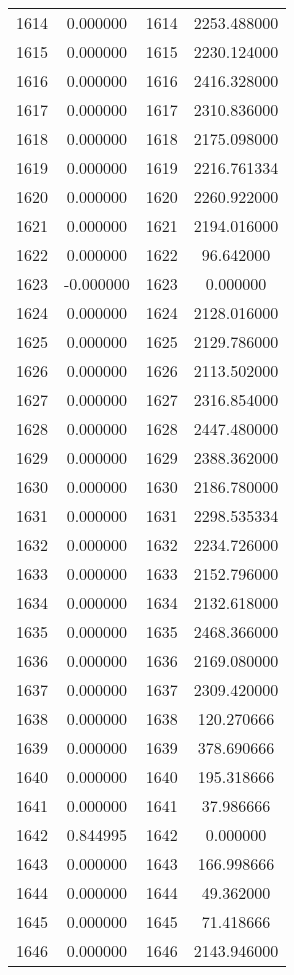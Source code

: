 \documentclass[12pt]{article}
\begin{document}
\begin{longtable}{@{}cccc@{}}
1614 & 0.000000 & 1614 & 2253.488000 \\
1615 & 0.000000 & 1615 & 2230.124000 \\
1616 & 0.000000 & 1616 & 2416.328000 \\
1617 & 0.000000 & 1617 & 2310.836000 \\
1618 & 0.000000 & 1618 & 2175.098000 \\
1619 & 0.000000 & 1619 & 2216.761334 \\
1620 & 0.000000 & 1620 & 2260.922000 \\
1621 & 0.000000 & 1621 & 2194.016000 \\
1622 & 0.000000 & 1622 & 96.642000 \\
1623 & -0.000000 & 1623 & 0.000000 \\
1624 & 0.000000 & 1624 & 2128.016000 \\
1625 & 0.000000 & 1625 & 2129.786000 \\
1626 & 0.000000 & 1626 & 2113.502000 \\
1627 & 0.000000 & 1627 & 2316.854000 \\
1628 & 0.000000 & 1628 & 2447.480000 \\
1629 & 0.000000 & 1629 & 2388.362000 \\
1630 & 0.000000 & 1630 & 2186.780000 \\
1631 & 0.000000 & 1631 & 2298.535334 \\
1632 & 0.000000 & 1632 & 2234.726000 \\
1633 & 0.000000 & 1633 & 2152.796000 \\
1634 & 0.000000 & 1634 & 2132.618000 \\
1635 & 0.000000 & 1635 & 2468.366000 \\
1636 & 0.000000 & 1636 & 2169.080000 \\
1637 & 0.000000 & 1637 & 2309.420000 \\
1638 & 0.000000 & 1638 & 120.270666 \\
1639 & 0.000000 & 1639 & 378.690666 \\
1640 & 0.000000 & 1640 & 195.318666 \\
1641 & 0.000000 & 1641 & 37.986666 \\
1642 & 0.844995 & 1642 & 0.000000 \\
1643 & 0.000000 & 1643 & 166.998666 \\
1644 & 0.000000 & 1644 & 49.362000 \\
1645 & 0.000000 & 1645 & 71.418666 \\
1646 & 0.000000 & 1646 & 2143.946000 \\

\end{longtable}
\end{document}
